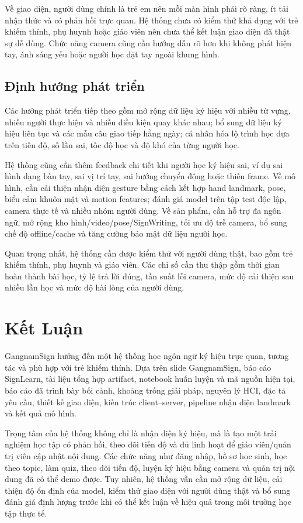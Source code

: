 \documentclass[conference]{IEEEtran}
\begin{document}
Về giao diện, người dùng chính là trẻ em nên mỗi màn hình phải rõ ràng, ít tải nhận thức và có phản hồi trực quan. Hệ thống chưa có kiểm thử khả dụng với trẻ khiếm thính, phụ huynh hoặc giáo viên nên chưa thể kết luận giao diện đã thật sự dễ dùng. Chức năng camera cũng cần hướng dẫn rõ hơn khi không phát hiện tay, ánh sáng yếu hoặc người học đặt tay ngoài khung hình.

\subsection{Định hướng phát triển}
Các hướng phát triển tiếp theo gồm mở rộng dữ liệu ký hiệu với nhiều từ vựng, nhiều người thực hiện và nhiều điều kiện quay khác nhau; bổ sung dữ liệu ký hiệu liên tục và các mẫu câu giao tiếp hằng ngày; cá nhân hóa lộ trình học dựa trên tiến độ, số lần sai, tốc độ học và độ khó của từng người học.

Hệ thống cũng cần thêm feedback chi tiết khi người học ký hiệu sai, ví dụ sai hình dạng bàn tay, sai vị trí tay, sai hướng chuyển động hoặc thiếu frame. Về mô hình, cần cải thiện nhận diện gesture bằng cách kết hợp hand landmark, pose, biểu cảm khuôn mặt và motion features; đánh giá model trên tập test độc lập, camera thực tế và nhiều nhóm người dùng. Về sản phẩm, cần hỗ trợ đa ngôn ngữ, mở rộng kho hình/video/pose/SignWriting, tối ưu độ trễ camera, bổ sung chế độ offline/cache và tăng cường bảo mật dữ liệu người học.

Quan trọng nhất, hệ thống cần được kiểm thử với người dùng thật, bao gồm trẻ khiếm thính, phụ huynh và giáo viên. Các chỉ số cần thu thập gồm thời gian hoàn thành bài học, tỷ lệ trả lời đúng, tần suất lỗi camera, mức độ cải thiện sau nhiều lần học và mức độ hài lòng của người dùng.

\section{Kết Luận}
GangnamSign hướng đến một hệ thống học ngôn ngữ ký hiệu trực quan, tương tác và phù hợp với trẻ khiếm thính. Dựa trên slide GangnamSign, báo cáo SignLearn, tài liệu tổng hợp artifact, notebook huấn luyện và mã nguồn hiện tại, báo cáo đã trình bày bối cảnh, khoảng trống giải pháp, nguyên lý HCI, đặc tả yêu cầu, thiết kế giao diện, kiến trúc client--server, pipeline nhận diện landmark và kết quả mô hình.

Trọng tâm của hệ thống không chỉ là nhận diện ký hiệu, mà là tạo một trải nghiệm học tập có phản hồi, theo dõi tiến độ và đủ linh hoạt để giáo viên/quản trị viên cập nhật nội dung. Các chức năng như đăng nhập, hồ sơ học sinh, học theo topic, làm quiz, theo dõi tiến độ, luyện ký hiệu bằng camera và quản trị nội dung đã có thể demo được. Tuy nhiên, hệ thống vẫn cần mở rộng dữ liệu, cải thiện độ ổn định của model, kiểm thử giao diện với người dùng thật và bổ sung đánh giá định lượng trước khi có thể kết luận về hiệu quả trong môi trường học tập thực tế.
\end{document}
